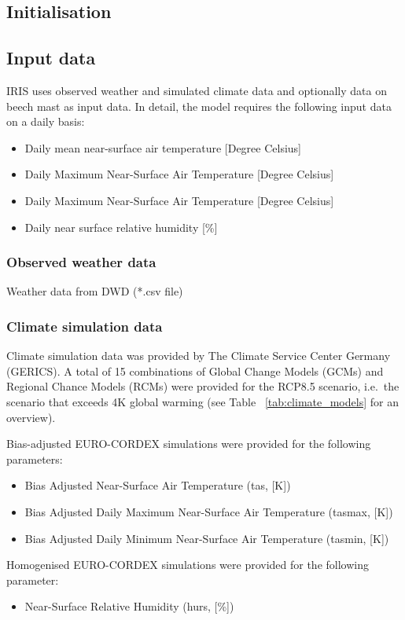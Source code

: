 \documentclass[a4paper, 11pt]{scrartcl}
\begin{document}
\subsection{Initialisation}

\subsection{Input data}
IRIS uses observed weather and simulated climate data and optionally data on beech mast as input data.
In detail, the model requires the following input data on a daily basis:
\begin{itemize}
\item Daily mean near-surface air temperature [Degree Celsius]
\item Daily Maximum Near-Surface Air Temperature [Degree Celsius]
\item Daily Maximum Near-Surface Air Temperature [Degree Celsius]
\item Daily near surface relative humidity [\%]
\end{itemize}

\subsubsection{Observed weather data}
Weather data from DWD (*.csv file)

\subsubsection{Climate simulation data}
Climate simulation data was provided by The Climate Service Center Germany (GERICS). A total of 15 combinations of Global Change Models
(GCMs) and Regional Chance Models (RCMs) were provided for the RCP8.5 scenario, i.e.\ the scenario that exceeds 4K global warming
(see Table ~\ref{tab:climate_models} for an overview).

Bias-adjusted EURO-CORDEX simulations were provided for the following parameters:
\begin{itemize}
\item Bias Adjusted Near-Surface Air Temperature (tas, [K])
\item Bias Adjusted Daily Maximum Near-Surface Air Temperature (tasmax, [K])
\item Bias Adjusted Daily Minimum Near-Surface Air Temperature (tasmin, [K])
\end{itemize}

Homogenised EURO-CORDEX simulations were provided for the following parameter:
\begin{itemize}
\item Near-Surface Relative Humidity (hurs, [\%])
\end{itemize}
\end{document}
